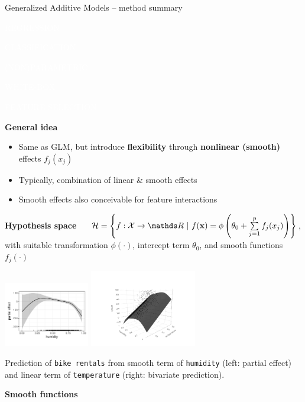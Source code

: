\documentclass[11pt,compress,t,notes=noshow, xcolor=table]{beamer}
\newcommand{\highlight}[1]{\textcolor{hlcol}{\textbf{#1}}}
\newcommand{\maketag}[2][100]{
  \colorbox{hlcol!#1}{\textcolor{white}{\MakeUppercase{\scriptsize #2}} 
  \vphantom{}}
}
\begin{document}
\begin{vbframe}{Generalized Additive Models -- method summary}
\maketag{regression} \maketag{classification} \maketag[50]{(NON)PARAMETRIC}
\maketag[50]{WHITE-BOX} \maketag[50]{Feature selection}
\medskip

\highlight{General idea}
\begin{itemize}
  \item Same as GLM, but introduce \textbf{flexibility} through
  \textbf{nonlinear (smooth)} effects $f_j(x_j)$
  \item Typically, combination of linear \& smooth effects
  \item Smooth effects also conceivable for feature interactions
\end{itemize}
\medskip

\highlight{Hypothesis space} ~~
$\Hspace = \left\{f: \Xspace \to \R ~|~\fx = \phi \left(\theta_0 + \textstyle \sumjp
f_j(x_j) \right) \right\}$,
with suitable transformation $\phi(\cdot)$, intercept term $\theta_0$, and smooth
functions $f_j(\cdot)$

\includegraphics[width=0.28\textwidth]{figure/gam_bike_partial_effect}
\includegraphics[width=0.35\textwidth, trim=0 0 0 80, clip]{figure/gam_bike_pred}

\tiny
Prediction of \texttt{bike rentals} from smooth term of \texttt{humidity}
(left: partial effect) and linear term of \texttt{temperature} (right: bivariate
prediction).
\normalsize

\framebreak

\highlight{Smooth functions}


\end{vbframe}
\end{document}
